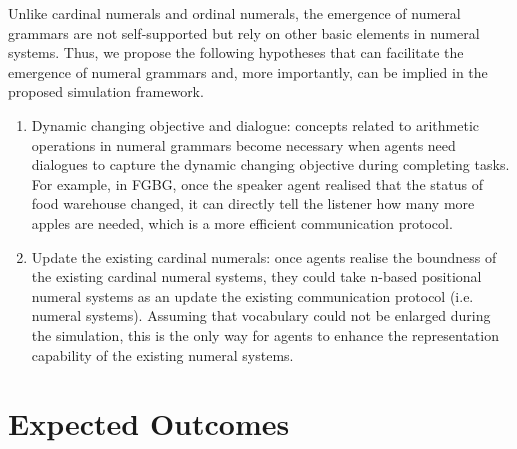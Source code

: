 \documentclass[a4paper,11pt]{article}
\begin{document}
Unlike cardinal numerals and ordinal numerals, the emergence of numeral grammars are not self-supported but rely on other basic elements in numeral systems. Thus, we propose the following hypotheses that can facilitate the emergence of numeral grammars and, more importantly, can be implied in the proposed simulation framework.

\begin{enumerate}
  \item Dynamic changing objective and dialogue: concepts related to arithmetic operations in numeral grammars become necessary when agents need dialogues to capture the dynamic changing objective during completing tasks. For example, in FGBG, once the speaker agent realised that the status of food warehouse changed, it can directly tell the listener how many more apples are needed, which is a more efficient communication protocol.
  \item Update the existing cardinal numerals: once agents realise the boundness of the existing cardinal numeral systems, they could take n-based positional numeral systems as an update the existing communication protocol (i.e. numeral systems). Assuming that vocabulary could not be enlarged during the simulation, this is the only way for agents to enhance the representation capability of the existing numeral systems.
\end{enumerate}


\section{Expected Outcomes}
\label{sec:4outcomes}
\end{document}
